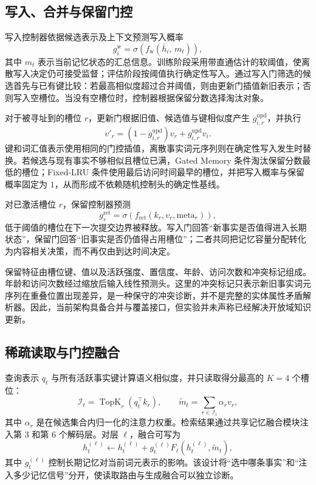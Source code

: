 \documentclass[letterpaper]{article}
\begin{document}
\subsection{写入、合并与保留门控}

写入控制器依据候选表示及上下文预测写入概率
\begin{equation}
g_i^{\mathrm{w}}=\sigma\!\left(f_{\mathrm{w}}(\bar h_i,\,m_t)\right),
\end{equation}
其中 $m_t$ 表示当前记忆状态的汇总信息。训练阶段采用带直通估计的软阈值，使离散写入决定仍可接受监督；评估阶段按阈值执行确定性写入。通过写入门筛选的候选首先与已有键比较：若最高相似度超过合并阈值，则由更新门插值新旧表示；否则写入空槽位。当没有空槽位时，控制器根据保留分数选择淘汰对象。

对于被寻址到的槽位 $r$，更新门根据旧值、候选值与键相似度产生 $g^{\mathrm{upd}}_{i,r}$，并执行
\begin{equation}
v'_r=(1-g^{\mathrm{upd}}_{i,r})v_r+
g^{\mathrm{upd}}_{i,r}v_i.
\end{equation}
键和词汇值表示使用相同的门控插值，离散事实词元序列则在确定性写入发生时替换。若候选与现有事实不够相似且槽位已满，Gated Memory 条件淘汰保留分数最低的槽位；Fixed-LRU 条件使用最后访问时间最早的槽位，并把写入概率与保留概率固定为 $1$，从而形成不依赖随机控制头的确定性基线。

对已激活槽位 $r$，保留控制器预测
\begin{equation}
g_r^{\mathrm{ret}}=\sigma\!\left(f_{\mathrm{ret}}
(k_r,v_r,\mathrm{meta}_r)\right),
\end{equation}
低于阈值的槽位在下一次提交边界被释放。写入门回答“新事实是否值得进入长期状态”，保留门回答“旧事实是否仍值得占用槽位”；二者共同把记忆容量分配转化为内容相关决策，而不再仅由到达时间决定。

保留特征由槽位键、值以及活跃强度、置信度、年龄、访问次数和冲突标记组成。年龄和访问次数经过缩放后输入线性预测头。这里的冲突标记只表示新旧事实词元序列在重叠位置出现差异，是一种保守的冲突诊断，并不是完整的实体属性矛盾解析器。因此，当前架构具备合并与覆盖接口，但实验并未声称已经解决开放域知识更新。

\subsection{稀疏读取与门控融合}

查询表示 $q_t$ 与所有活跃事实键计算语义相似度，并只读取得分最高的 $K=4$ 个槽位：
\begin{equation}
\mathcal{I}_t=\operatorname{TopK}_{r}
\left(q_t^\top k_r\right),\qquad
\tilde m_t=\sum_{r\in\mathcal{I}_t}\alpha_r v_r,
\end{equation}
其中 $\alpha_r$ 是在候选集合内归一化的注意力权重。检索结果通过共享记忆融合模块注入第 3 和第 6 个解码层。对层 $\ell$，融合可写为
\begin{equation}
h_t^{(\ell)}\leftarrow h_t^{(\ell)}+
g_t^{(\ell)}F_{\ell}\!\left(h_t^{(\ell)},\tilde m_t\right),
\end{equation}
其中 $g_t^{(\ell)}$ 控制长期记忆对当前词元表示的影响。该设计将“选中哪条事实”和“注入多少记忆信号”分开，使读取路由与生成融合可以独立诊断。
\end{document}
